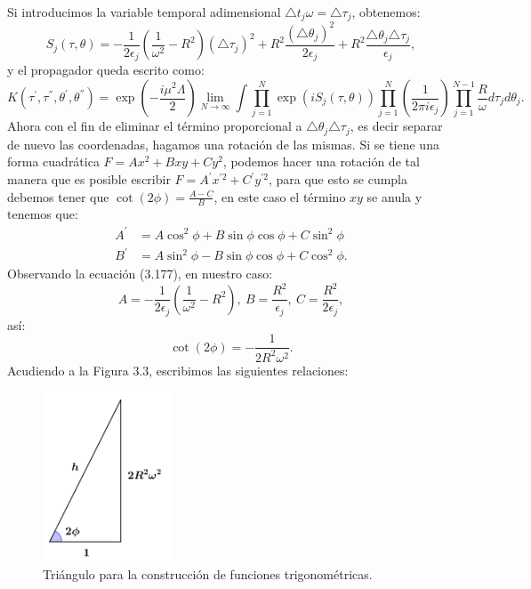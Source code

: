 Si introducimos la variable temporal adimensional $\triangle t_j\omega =\triangle \tau_j$, obtenemos:
\begin{equation}
S_{j}(\tau,\theta)=-\frac{1}{2\epsilon_{j}}\left(\frac{1}{\omega^{2}}-R^{2}\right)(\triangle\tau_{j})^{2}+R^{2}\frac{(\triangle\theta_{j})^{2}}{2\epsilon_{j}}+R^{2}\frac{\triangle\theta_{j}\triangle\tau_{j}}{\epsilon_{j}},
\end{equation}
y el propagador queda escrito como:
\begin{equation}
K(\tau^{'},\tau^{''},\theta^{'},\theta^{''})=\exp\left(-\frac{i\mu^{2}\Lambda}{2}\right)\lim_{N\to\infty}\int\prod_{j=1}^{N}\exp(iS_{j}(\tau,\theta))\prod_{j=1}^{N}\left(\frac{1}{2\pi i\epsilon_{j}}\right)\prod_{j=1}^{N-1}\frac{R}{\omega}d\tau_{j}d\theta_{j}.
\end{equation}
Ahora con el fin de eliminar el término proporcional a $\triangle \theta_j\triangle \tau_j$, es decir separar de nuevo las coordenadas, hagamos una rotación de las mismas. Si se tiene una forma cuadrática $F=Ax^2+Bxy+Cy^2$, podemos hacer una rotación de tal manera que es posible escribir $F=A^{'}x^{'2}+C^{'}y^{'2}$, para que esto se cumpla debemos tener que $\cot (2\phi)=\frac{A-C}{B}$, en este caso el término $xy$ se anula y tenemos que:
\begin{align}
\nonumber A^{'}&=A\cos^{2}\phi+B\sin\phi\cos\phi+C\sin^{2}\phi\\
B^{'}&=A\sin^{2}\phi-B\sin\phi\cos\phi+C\cos^{2}\phi.
\end{align}
Observando la ecuación (3.177), en nuestro caso:
\begin{equation}
A=-\frac{1}{2\epsilon_{j}}\left(\frac{1}{\omega^{2}}-R^{2}\right),\ B=\frac{R^{2}}{\epsilon_{j}},\ C=\frac{R^{2}}{2\epsilon_{j}},
\end{equation}
así:
\begin{equation}
\cot(2\phi)=-\frac{1}{2R^{2}\omega^{2}}.
\end{equation}
Acudiendo a la Figura 3.3, escribimos las siguientes relaciones:
\begin{figure}[h!]
\centering
\includegraphics[width=3.8cm]{Imagenes/Fig19}
\caption[Triángulo de funciones trigonométricas.]{Triángulo para la construcción de funciones trigonométricas.}
\end{figure}

